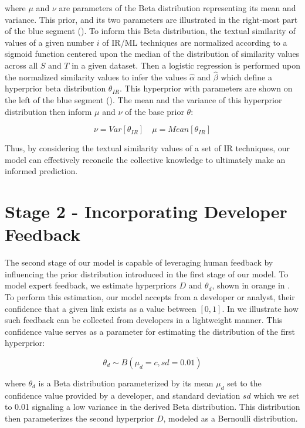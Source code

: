 \noindent where $\mu$ and $\nu$ are parameters of the Beta distribution representing its mean and variance. This prior, and its two parameters are illustrated in the right-most part of the blue segment (). To inform this Beta distribution, the textual similarity of values of a given number $i$ of IR/ML techniques are normalized according to a sigmoid function centered upon the median of the distribution of similarity values across all $S$ and $T$ in a given dataset. Then a logistic regression is performed upon the normalized similarity values to infer the values $\hat{\alpha}$ and $\hat{\beta}$ which define a hyperprior beta distribution $\theta_{IR}$. This hyperprior with parameters are shown on the left of the blue segment (). The mean and the variance of this hyperprior distribution then inform $\mu$ and $\nu$ of the base prior $\theta$:


\begin{equation}\label{eq:lvl1-params}
\nu = Var[\theta_{IR}] \quad \mu = Mean[\theta_{IR}]
\end{equation}

Thus, by considering the textual similarity values of a set of IR techniques, our model can effectively reconcile the collective knowledge to ultimately make an informed prediction.

\section{Stage 2 - Incorporating Developer Feedback}
\label{sec:model-comp2}

The second stage of our model is capable of leveraging human feedback by influencing the prior distribution introduced in the first stage of our model. To model expert feedback, we estimate hyperpriors $D$ and $\theta_d$, shown in orange in . To perform this estimation, our model accepts from a developer or analyst, their confidence that a given link exists as a value between $[0,1]$. In   we illustrate how such feedback can be collected from developers in a lightweight manner. This confidence value serves as a parameter for estimating the distribution of the first hyperprior:

\begin{equation}
\theta_{d} \sim B(\mu_{d}=c,sd=0.01)	
\end{equation}

\noindent where $\theta_{d}$ is a Beta distribution parameterized by its mean $\mu_d$ set to the confidence value provided by a developer, and standard deviation $sd$ which we set to 0.01 signaling a low variance in the derived Beta distribution. This distribution then parameterizes the second hyperprior $D$, modeled as a Bernoulli distribution.

